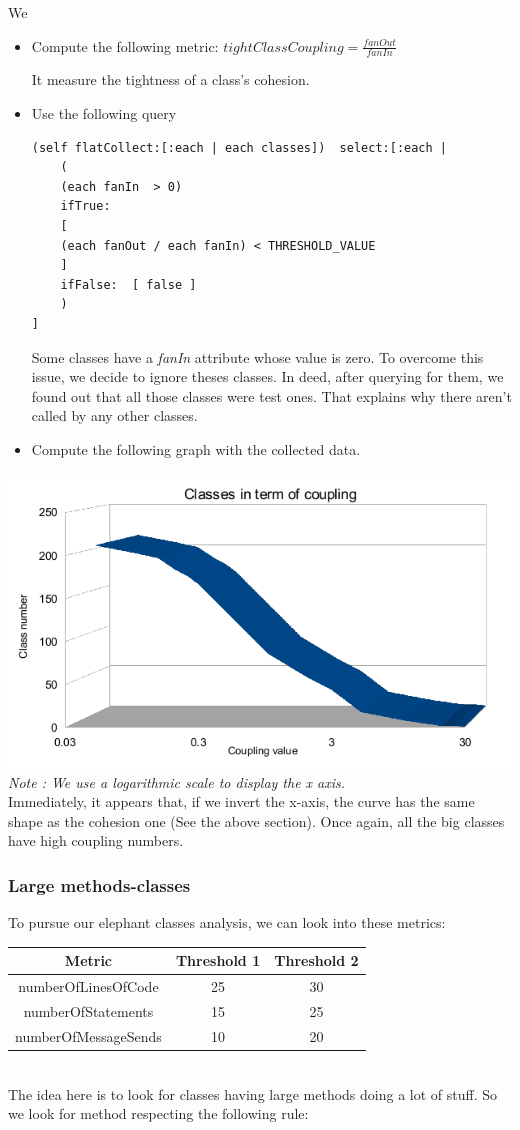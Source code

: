 \documentclass[11pt,a4paper]{article}
\begin{document}
We 
\begin{itemize}

\item Compute the following metric:
$tightClassCoupling = \frac{fanOut}{fanIn}$

It measure the tightness of a class's cohesion.
\item Use the following query
\begin{lstlisting}
(self flatCollect:[:each | each classes])  select:[:each | 
	(
	(each fanIn  > 0)  
	ifTrue: 
	[
	(each fanOut / each fanIn) < THRESHOLD_VALUE
	]
	ifFalse:  [ false ]
	)
]
\end{lstlisting}
Some classes have a \textit{fanIn} attribute whose value is zero. To overcome this issue, we decide to ignore theses classes. In deed, after querying for them, we found out that all those classes were test ones. That explains why there aren’t called by any other classes. 

\item{Compute the following graph with the collected data.}
\end{itemize}

 
\includegraphics[width=\textwidth]{coupling_result}
\textit{Note : We use a logarithmic scale to display the x axis.}\\

Immediately, it appears that, if we invert the x-axis, the curve has the same shape as the cohesion one (See the above section). Once again, all the big classes have high coupling numbers.
\subsubsection{Large methods-classes}
To pursue our elephant classes analysis, we can look into these metrics:\\
\begin{tabular}{| c | c | c |}
\hline
Metric & Threshold 1 & Threshold 2\\
\hline
numberOfLinesOfCode & 25 & 30\\
\hline
numberOfStatements & 15 & 25\\
\hline
numberOfMessageSends & 10 & 20\\
\hline
\end{tabular}\\
The idea here is to look for classes having large methods doing a lot of stuff. So we look for method respecting the following rule:
\end{document}
